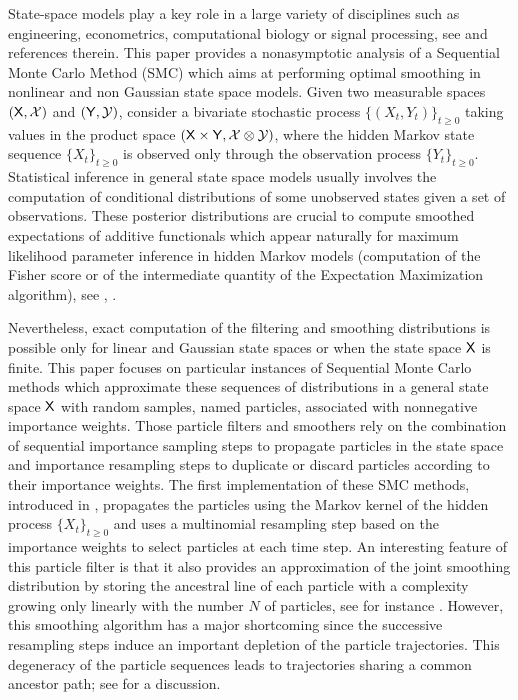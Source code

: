 State-space models play a key role in a large variety of disciplines such as engineering, econometrics, computational biology or signal processing, see \cite{douc:moulines:stoffer:2014,doucet:defreitas:gordon:2001} and references therein. This paper provides a nonasymptotic analysis of a Sequential Monte Carlo Method (SMC) which aims at performing optimal smoothing in nonlinear and non Gaussian state space models. Given two measurable spaces $(\mathsf{X},\mathcal{X})$ and $(\mathsf{Y},\mathcal{Y})$, consider a bivariate stochastic process $\{(X_{t},Y_{t})\}_{t\geq 0}$ taking values in the product space $(\mathsf{X}\times\mathsf{Y},\mathcal{X}\otimes\mathcal{Y})$, where the hidden Markov state sequence $\{X_{t}\}_{t\geq 0}$ is observed only through the observation process $\{Y_{t}\}_{t\geq 0}$.
Statistical inference in general state space models usually involves the computation  of conditional distributions of some unobserved states given a set of observations. These posterior distributions are crucial to compute smoothed expectations of additive functionals which appear naturally for maximum likelihood parameter inference in hidden Markov models (computation of the Fisher score or of the intermediate quantity of the Expectation Maximization algorithm), see \cite[Chapter $10$ and $11$]{cappe:moulines:ryden:2005}, \cite{kantas:doucet:signh:2015,lecorff:fort:2013a,lecorff:fort:2013b,doucet:poyiadjis:singh:2011}.

Nevertheless, exact computation of the filtering and smoothing distributions is possible only for linear and Gaussian state spaces or when the state space $\mathsf{X}$ is finite. This paper focuses on particular  instances of Sequential Monte Carlo methods which approximate these sequences of distributions in a general state space $\mathsf{X}$ with random samples, named particles, associated with nonnegative importance weights. Those particle filters and smoothers rely on the combination of sequential importance sampling steps to propagate particles in the state space and importance resampling steps to duplicate or discard particles according to their importance weights. The first implementation of these SMC methods, introduced in \cite{gordon:salmond:smith:1993,kitagawa:1996}, propagates the particles using the Markov kernel of the hidden process $\{X_{t}\}_{t\geq 0}$ and uses a multinomial resampling step based on the importance weights to select particles at each time step. An interesting feature of this particle filter is that it also provides an approximation of the joint smoothing distribution by storing the ancestral line of each particle with a complexity growing only linearly with the number $N$ of particles, see for instance \cite{delmoral:2004}. However, this smoothing algorithm has a major shortcoming since the successive resampling steps induce  an important  depletion of the particle trajectories. This degeneracy of the particle sequences leads to trajectories sharing a common ancestor path; see \cite{jacob:murray:rubenthaler:2013,doucet:poyiadjis:singh:2011} for a discussion.



